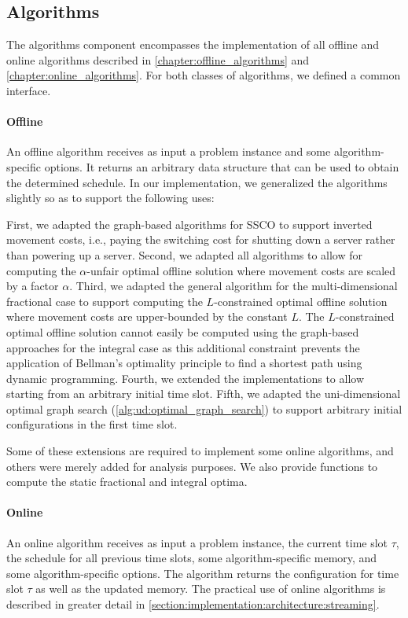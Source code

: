 \subsection{Algorithms}

The algorithms component encompasses the implementation of all offline and online algorithms described in \autoref{chapter:offline_algorithms} and \autoref{chapter:online_algorithms}. For both classes of algorithms, we defined a common interface.

\paragraph{Offline} An offline algorithm receives as input a problem instance and some algorithm-specific options. It returns an arbitrary data structure that can be used to obtain the determined schedule. In our implementation, we generalized the algorithms slightly so as to support the following uses:

First, we adapted the graph-based algorithms for SSCO to support inverted movement costs, i.e., paying the switching cost for shutting down a server rather than powering up a server. Second, we adapted all algorithms to allow for computing the $\alpha$-unfair optimal offline solution where movement costs are scaled by a factor $\alpha$. Third, we adapted the general algorithm for the multi-dimensional fractional case to support computing the $L$-constrained optimal offline solution where movement costs are upper-bounded by the constant $L$. The $L$-constrained optimal offline solution cannot easily be computed using the graph-based approaches for the integral case as this additional constraint prevents the application of Bellman's optimality principle to find a shortest path using dynamic programming. Fourth, we extended the implementations to allow starting from an arbitrary initial time slot. Fifth, we adapted the uni-dimensional optimal graph search (\autoref{alg:ud:optimal_graph_search}) to support arbitrary initial configurations in the first time slot.

Some of these extensions are required to implement some online algorithms, and others were merely added for analysis purposes. We also provide functions to compute the static fractional and integral optima.

\paragraph{Online} An online algorithm receives as input a problem instance, the current time slot $\tau$, the schedule for all previous time slots, some algorithm-specific memory, and some algorithm-specific options. The algorithm returns the configuration for time slot $\tau$ as well as the updated memory. The practical use of online algorithms is described in greater detail in \autoref{section:implementation:architecture:streaming}.


